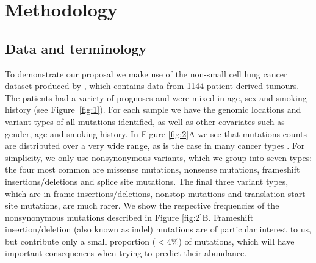 \documentclass[12pt]{article}
\begin{document}



\section{Methodology}
\label{sec:methodology}
\subsection{Data and terminology \label{sec:dataterminology}}
To demonstrate our proposal we make use of the non-small cell lung cancer dataset produced by \citet{campbell_distinct_2016}, which contains data from 1144 patient-derived tumours. The patients had a variety of prognoses and were mixed in age, sex and smoking history (see Figure~\ref{fig:1}). For each sample we have the genomic locations and variant types of all mutations identified, as well as other covariates such as gender, age and smoking history. In Figure \ref{fig:2}A we see that mutations counts are distributed over a very wide range, as is the case in many cancer types \citep{chalmers_analysis_2017}. For simplicity, we only use nonsynonymous variants, which we group into seven types: the four most common are missense mutations, nonsense mutations, frameshift insertions/deletions and splice site mutations. The final three variant types, which are in-frame insertions/deletions, nonstop mutations and translation start site mutations, are much rarer. We show the respective frequencies of the nonsynonymous mutations described in Figure \ref{fig:2}B. Frameshift insertion/deletion (also known as indel) mutations are of particular interest to us, but contribute only a small proportion ($<4\%$) of mutations, which will have important consequences when trying to predict their abundance. 
\end{document}
